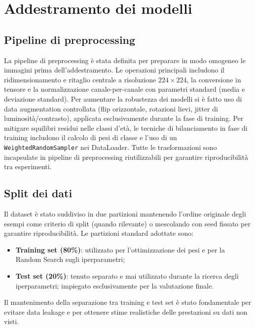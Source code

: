 \documentclass[a4paper,12pt]{report}
\begin{document}
	\section{Addestramento dei modelli}
	
	\subsection{Pipeline di preprocessing}
	La pipeline di preprocessing è stata definita per preparare in modo omogeneo le immagini prima dell'addestramento. Le operazioni principali includono il ridimensionamento e ritaglio centrale a risoluzione \(224\times224\), la conversione in tensore e la normalizzazione canale-per-canale con parametri standard (media e deviazione standard). Per aumentare la robustezza dei modelli si è fatto uso di data augmentation controllata (flip orizzontale, rotazioni lievi, jitter di luminosità/contrasto), applicata esclusivamente durante la fase di training. Per mitigare squilibri residui nelle classi d'età, le tecniche di bilanciamento in fase di training includono il calcolo di pesi di classe e l'uso di un \texttt{WeightedRandomSampler} nei DataLoader. Tutte le trasformazioni sono incapsulate in pipeline di preprocessing riutilizzabili per garantire riproducibilità tra esperimenti.
	
	\subsection{Split dei dati}
	Il dataset è stato suddiviso in due partizioni mantenendo l'ordine originale degli esempi come criterio di split (quando rilevante) o mescolando con seed fissato per garantire riproducibilità. Le partizioni standard adottate sono:
	\begin{itemize}
		\item \textbf{Training set (80\%)}: utilizzato per l'ottimizzazione dei pesi e per la Random Search sugli iperparametri;
		\item \textbf{Test set (20\%)}: tenuto separato e mai utilizzato durante la ricerca degli iperparametri; impiegato esclusivamente per la valutazione finale.
	\end{itemize}
	Il mantenimento della separazione tra training e test set è stato fondamentale per evitare data leakage e per ottenere stime realistiche delle prestazioni su dati non visti.
	
\end{document}

